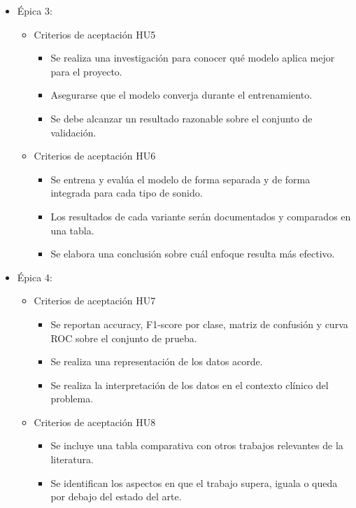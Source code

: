 \documentclass[
11pt, %
]{charter}
\begin{document}
\begin{itemize}
\begin{itemize}
    \end{itemize}
  \item Épica 3:
    \begin{itemize}
      \item Criterios de aceptación HU5
        \begin{itemize}
          \item Se realiza una investigación para conocer qué modelo aplica mejor para el proyecto.
          \item Asegurarse que el modelo converja durante el entrenamiento.
          \item Se debe alcanzar un resultado razonable sobre el conjunto de validación.
        \end{itemize}
      \item Criterios de aceptación HU6
        \begin{itemize}
          \item Se entrena y evalúa el modelo de forma separada y de forma integrada para cada tipo de sonido.
          \item Los resultados de cada variante serán documentados y comparados en una tabla.
          \item Se elabora una conclusión sobre cuál enfoque resulta más efectivo.
        \end{itemize}
    \end{itemize}
  \item Épica 4:
    \begin{itemize}
      \item Criterios de aceptación HU7
        \begin{itemize}
          \item Se reportan accuracy, F1-score por clase, matriz de confusión y curva ROC sobre el conjunto de prueba.
          \item Se realiza una representación de los datos acorde.
          \item Se realiza la interpretación de los datos en el contexto clínico del problema.
        \end{itemize}
      \item Criterios de aceptación HU8
        \begin{itemize}
          \item Se incluye una tabla comparativa con otros trabajos relevantes de la literatura.
          \item Se identifican los aspectos en que el trabajo supera, iguala o queda por debajo del estado del arte.

\end{itemize}
\end{itemize}
\end{itemize}
\end{document}
